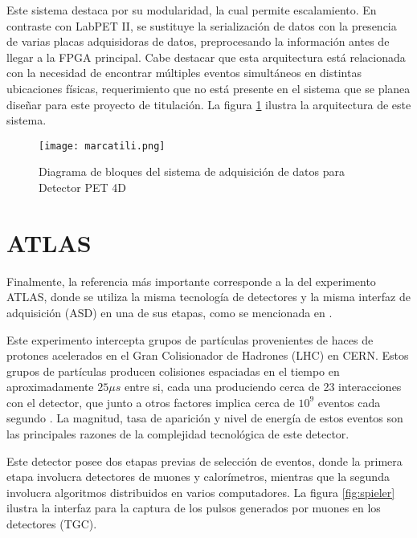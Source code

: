 	\par Este sistema destaca por su modularidad, la cual permite escalamiento. En contraste con LabPET II, se sustituye la serialización de datos con la presencia de varias placas adquisidoras de datos, preprocesando la información antes de llegar a la FPGA principal. Cabe destacar que esta arquitectura está relacionada con la necesidad de encontrar múltiples eventos simultáneos en distintas ubicaciones físicas, requerimiento que no está presente en el sistema que se planea diseñar para este proyecto de titulación. La figura \ref{fig:marcatili} ilustra la arquitectura de este sistema.
	
	\begin{figure}[h]
		\centering
		\texttt{[image: marcatili.png]}
		\caption{Diagrama de bloques del sistema de adquisición de datos para Detector PET 4D \cite{Marcatili2011DevelopmentDetector}}
		\label{fig:marcatili}
	\end{figure}
	
\newpage
\section{ATLAS}
	
	\par Finalmente, la referencia más importante corresponde a la del experimento ATLAS, donde se utiliza la misma tecnología de detectores y la misma interfaz de adquisición (ASD) en una de sus etapas, como se mencionada en \cite{Spieler2012ElectronicsAcquisition}.
	
	\par Este experimento intercepta grupos de partículas provenientes de haces de protones acelerados en el Gran Colisionador de Hadrones (LHC) en CERN. Estos grupos de partículas producen colisiones espaciadas en el tiempo en aproximadamente $25\mu s$ entre si, cada una produciendo cerca de 23 interacciones con el detector, que junto a otros factores implica cerca de $10^9$ eventos cada segundo \cite{Whiteson2016TheSystem}. La magnitud, tasa de aparición y nivel de energía de estos eventos son las principales razones de la complejidad tecnológica de este detector.
	
	\par Este detector posee dos etapas previas de selección de eventos, donde la primera etapa involucra detectores de muones y calorímetros, mientras que la segunda involucra algoritmos distribuidos en varios computadores. La figura \ref{fig:spieler} ilustra la interfaz para la captura de los pulsos generados por muones en los detectores (TGC).
	
